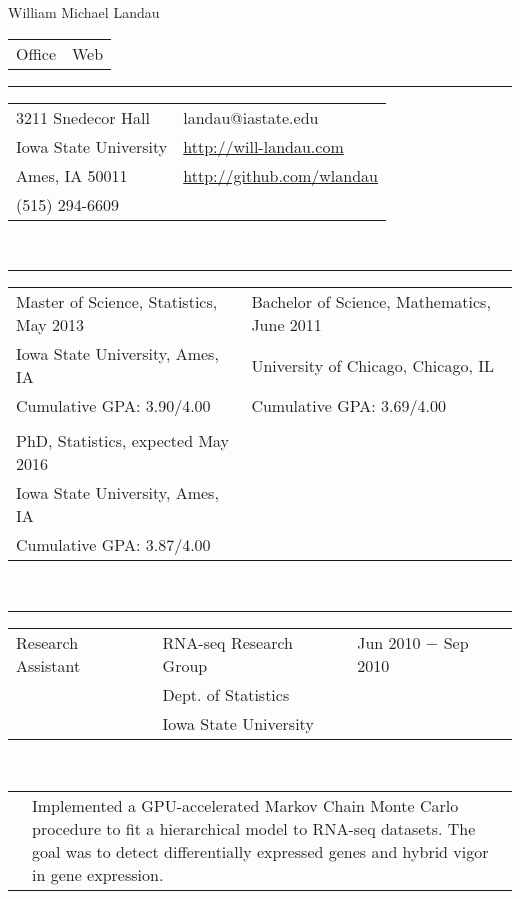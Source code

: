 \documentclass{article}
\newcommand{\q}{$\quad$ \newline}
\newcommand{\vl}{4.25}
\newcommand{\wl}{8.4}
\newcommand{\ww}{13}
\newcommand{\myrule}{\noindent \rule{\textwidth}{1pt}}
\begin{document}
\begin{center}
\LARGE William Michael Landau
\end{center}

\noindent \begin{tabular}{@{}p{13cm}l@{}}
\LARGE Office & \LARGE Web 
\end{tabular}

\myrule

\noindent \begin{tabular}{@{}p{13cm}l@{}}
3211 Snedecor Hall & landau@iastate.edu \\
Iowa State University & \href{http://will-landau.com/}{http://will-landau.com} \\
Ames, IA 50011 & \href{http://github.com/wlandau}{http://github.com/wlandau} \\
(515) 294-6609
\end{tabular} \q \q \q


\myrule

\noindent \begin{tabular}{@{}p{9cm}l@{}}
Master of Science, Statistics, May 2013 &  Bachelor of Science, Mathematics, June 2011   \\
 Iowa State University, Ames, IA  & University of Chicago, Chicago, IL  \\ 
Cumulative GPA: 3.90/4.00 & Cumulative GPA: 3.69/4.00 \\
 & \\
PhD, Statistics, expected May 2016 & \\
Iowa State University, Ames, IA  & \\
Cumulative GPA: 3.87/4.00 \\
\end{tabular} \q \q \q


\myrule

\noindent \begin{tabular}{@{}p{\vl cm}p{\wl cm}l@{}}
Research Assistant & RNA-seq Research Group & Jun 2010 $-$ Sep 2010  \\ 
 &Dept. of Statistics&  \\ 
 &Iowa State University&
\end{tabular} \q \q

\noindent \begin{tabular}{@{}p{\vl cm}p{\ww cm}@{}}
&Implemented a GPU-accelerated Markov Chain Monte Carlo
procedure to fit a hierarchical model to RNA-seq datasets. The goal was to detect 
differentially expressed genes and hybrid vigor in gene expression.
\end{tabular} \q \q
\end{document}
